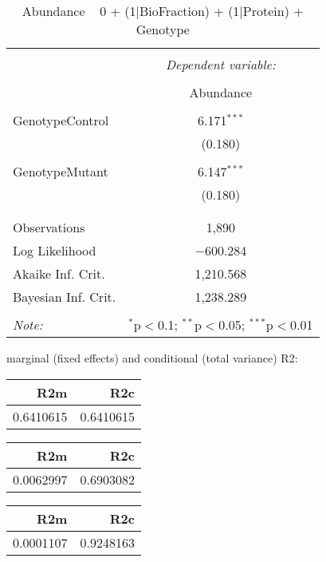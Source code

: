 \documentclass[11pt]{report}
\begin{document}
\begin{table}[!htbp] \centering 
  \caption{Abundance ~ 0 + (1|BioFraction) + (1|Protein) + Genotype} 
  \label{} 
\begin{tabular}{@{\extracolsep{5pt}}lc} 
\\[-1.8ex]\hline 
\hline \\[-1.8ex] 
 & \multicolumn{1}{c}{\textit{Dependent variable:}} \\ 
\cline{2-2} 
\\[-1.8ex] & Abundance \\ 
\hline \\[-1.8ex] 
 GenotypeControl & 6.171$^{***}$ \\ 
  & (0.180) \\ 
  & \\ 
 GenotypeMutant & 6.147$^{***}$ \\ 
  & (0.180) \\ 
  & \\ 
\hline \\[-1.8ex] 
Observations & 1,890 \\ 
Log Likelihood & $-$600.284 \\ 
Akaike Inf. Crit. & 1,210.568 \\ 
Bayesian Inf. Crit. & 1,238.289 \\ 
\hline 
\hline \\[-1.8ex] 
\textit{Note:}  & \multicolumn{1}{r}{$^{*}$p$<$0.1; $^{**}$p$<$0.05; $^{***}$p$<$0.01} \\ 
\end{tabular} 
\end{table} 
marginal (fixed effects) and conditional (total variance) R2:

\begin{tabular}{r|r}
\hline
R2m & R2c\\
\hline
0.6410615 & 0.6410615\\
\hline
\end{tabular}

\begin{tabular}{r|r}
\hline
R2m & R2c\\
\hline
0.0062997 & 0.6903082\\
\hline
\end{tabular}

\begin{tabular}{r|r}
\hline
R2m & R2c\\
\hline
0.0001107 & 0.9248163\\
\hline
\end{tabular}
\end{document}
